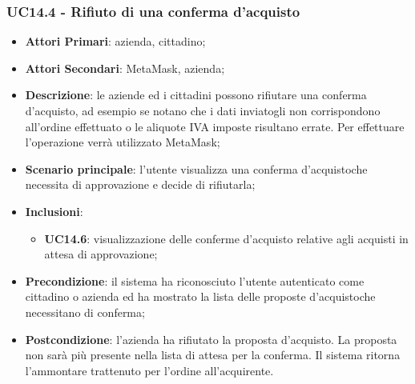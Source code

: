 \subsubsection{UC14.4 - Rifiuto di una conferma d'acquisto}
\begin{itemize}
	\item \textbf{Attori Primari}: azienda, cittadino;
	\item \textbf{Attori Secondari}: MetaMask\glo, azienda;
	\item \textbf{Descrizione}: le aziende ed i cittadini possono rifiutare una conferma d'acquisto\glo, ad esempio se notano che i dati inviatogli non corrispondono all'ordine effettuato o le aliquote IVA imposte risultano errate. Per effettuare l'operazione verrà utilizzato MetaMask\glo;
	\item \textbf{Scenario principale}: l'utente visualizza una conferma d'acquisto\glosp che necessita di approvazione e decide di rifiutarla;
	\item \textbf{Inclusioni}: 
	\begin{itemize}
		\item \textbf{UC14.6}: visualizzazione delle conferme d'acquisto 
		relative agli acquisti in attesa di approvazione;
	\end{itemize}
	\item \textbf{Precondizione}: il sistema ha riconosciuto l'utente autenticato come cittadino o azienda ed ha mostrato la lista delle proposte d'acquisto\glosp che necessitano di conferma;
	\item \textbf{Postcondizione}: l'azienda ha rifiutato la proposta 
	d'acquisto\glo. La proposta non sarà più presente nella lista di attesa per 
	la conferma. Il sistema ritorna l'ammontare trattenuto per l'ordine 
	all'acquirente.
\end{itemize}
